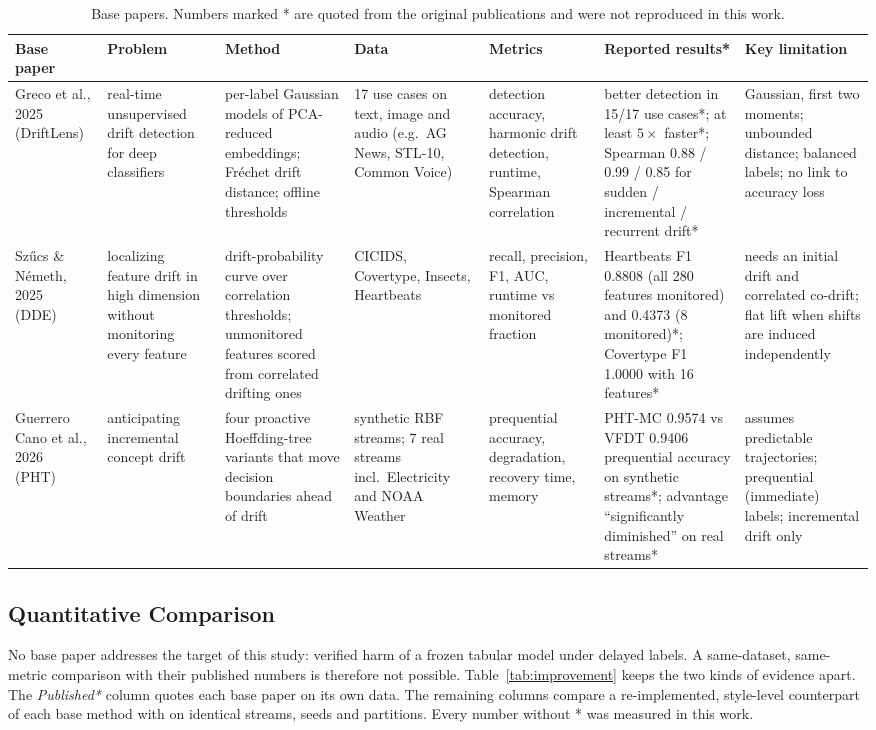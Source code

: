 \begin{table}[t]
\centering
\caption{Base papers. Numbers marked * are quoted from the original publications and were not reproduced in this work.}
\label{tab:basepapers}
\setlength{\tabcolsep}{3pt}
\footnotesize
\begin{tabular}{L{2.0cm}L{2.3cm}L{2.7cm}L{2.4cm}L{1.9cm}L{2.8cm}L{2.3cm}}
\toprule
Base paper & Problem & Method & Data & Metrics & Reported results* & Key limitation \\
\midrule
Greco et al., 2025~\cite{greco2025driftlens} (DriftLens) & real-time unsupervised drift detection for deep classifiers & per-label Gaussian models of PCA-reduced embeddings; Fréchet drift distance; offline thresholds & 17 use cases on text, image and audio (e.g.\ AG News, STL-10, Common Voice) & detection accuracy, harmonic drift detection, runtime, Spearman correlation & better detection in 15/17 use cases*; at least $5\times$ faster*; Spearman 0.88 / 0.99 / 0.85 for sudden / incremental / recurrent drift* & Gaussian, first two moments; unbounded distance; balanced labels; no link to accuracy loss \\
Sz\H{u}cs \& N\'emeth, 2025~\cite{szucs2025dde} (DDE) & localizing feature drift in high dimension without monitoring every feature & drift-probability curve over correlation thresholds; unmonitored features scored from correlated drifting ones & CICIDS, Covertype, Insects, Heartbeats & recall, precision, F1, AUC, runtime vs monitored fraction & Heartbeats F1 0.8808 (all 280 features monitored) and 0.4373 (8 monitored)*; Covertype F1 1.0000 with 16 features* & needs an initial drift and correlated co-drift; flat lift when shifts are induced independently \\
Guerrero Cano et al., 2026~\cite{guerrerocano2026proactive} (PHT) & anticipating incremental concept drift & four proactive Hoeffding-tree variants that move decision boundaries ahead of drift & synthetic RBF streams; 7 real streams incl.\ Electricity and NOAA Weather & prequential accuracy, degradation, recovery time, memory & PHT-MC 0.9574 vs VFDT 0.9406 prequential accuracy on synthetic streams*; advantage ``significantly diminished'' on real streams* & assumes predictable trajectories; prequential (immediate) labels; incremental drift only \\
\bottomrule
\end{tabular}
\end{table}

\subsection{Quantitative Comparison}

No base paper addresses the target of this study: verified harm of a frozen tabular
model under delayed labels. A same-dataset, same-metric comparison with their
published numbers is therefore not possible. Table~\ref{tab:improvement} keeps the two
kinds of evidence apart. The \emph{Published*} column quotes each base paper on its own
data. The remaining columns compare a re-implemented, style-level counterpart of each
base method with \idm{} on identical streams, seeds and partitions. Every number
without * was measured in this work.


